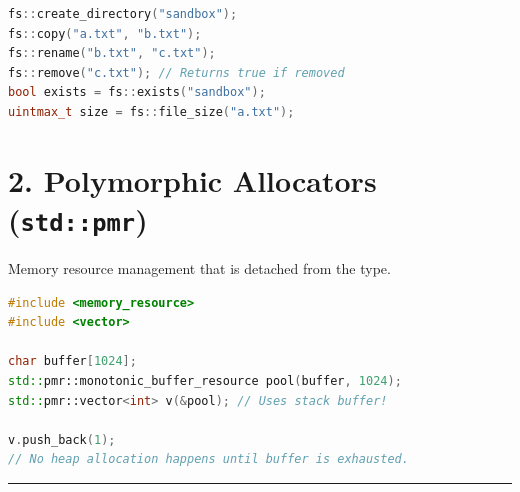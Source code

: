 \begin{lstlisting}[language={C++}]
fs::create_directory("sandbox");
fs::copy("a.txt", "b.txt");
fs::rename("b.txt", "c.txt");
fs::remove("c.txt"); // Returns true if removed
bool exists = fs::exists("sandbox");
uintmax_t size = fs::file_size("a.txt");
\end{lstlisting}

\hypertarget{polymorphic-allocators-stdpmr}{%
\section{\texorpdfstring{2. Polymorphic Allocators
(\texttt{std::pmr})}{2. Polymorphic Allocators (std::pmr)}}\label{polymorphic-allocators-stdpmr}}

Memory resource management that is detached from the type.

\begin{lstlisting}[language={C++}]
#include <memory_resource>
#include <vector>

char buffer[1024];
std::pmr::monotonic_buffer_resource pool(buffer, 1024);
std::pmr::vector<int> v(&pool); // Uses stack buffer!

v.push_back(1); 
// No heap allocation happens until buffer is exhausted.
\end{lstlisting}

\begin{center}\rule{0.5\linewidth}{0.5pt}\end{center}
